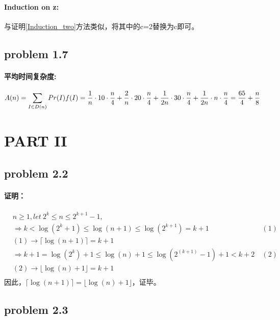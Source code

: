 \documentclass[11pt]{ctexart}
\begin{document}
	\paragraph{Induction on z:}
	与证明\ref{Induction_two}方法类似，将其中的c=2替换为c即可。
	
	\subsection*{problem 1.7}
	\paragraph{平均时间复杂度:}
	\begin{equation}
	A(n)=\sum_{I\in D(n)} Pr(I)f(I)=\frac{1}{n}\cdot10\cdot\frac{n}{4}+\frac{2}{n}\cdot20\cdot\frac{n}{4}+\frac{1}{2n}\cdot30\cdot\frac{n}{4}+\frac{1}{2n}\cdot n\cdot\frac{n}{4}=\frac{65}{4}+\frac{n}{8} \notag
	\end{equation}
	\newpage
	\section*{PART II}
	\subsection*{problem 2.2}
	\paragraph{证明：}
	\begin{equation*}
	\begin{aligned}
	&n \geq 1,let\ 2^k \leq n \leq 2^{k+1}-1,\\
	&\Rightarrow	k<\log(2^k+1)\leq\log(n+1)\leq\log(2^{k+1})=k+1&\ (1)\\
	&(1)\rightarrow \lceil\log(n+1)\rceil=k+1\\
	&\Rightarrow k+1=\log(2^k)+1\leq\log(n)+1\leq\log(2^(k+1)-1)+1<k+2&\ (2)\\
	&(2)\rightarrow \lfloor\log(n)+1\rfloor=k+1\\
	\end{aligned}
	\end{equation*}
	因此，$\lceil\log(n+1)\rceil=\lfloor\log(n)+1\rfloor$，证毕。
	\subsection*{problem 2.3}
\end{document}
